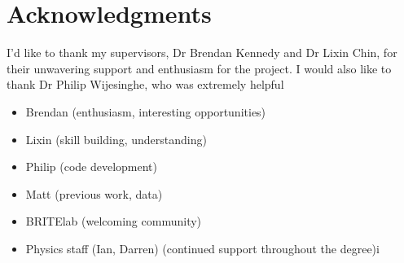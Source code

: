 \chapter*{Acknowledgments}
\thispagestyle{empty}

I'd like to thank my supervisors, Dr Brendan Kennedy and Dr Lixin Chin, for their unwavering support and enthusiasm for the project. 
I would also like to thank Dr Philip Wijesinghe, who was extremely helpful 

\begin{itemize}
\item Brendan (enthusiasm, interesting opportunities)
\item Lixin (skill building, understanding)
\item Philip (code development)
\item Matt (previous work, data)
\item BRITElab (welcoming community)
\item Physics staff (Ian, Darren) (continued support throughout the degree)i
\end{itemize}
